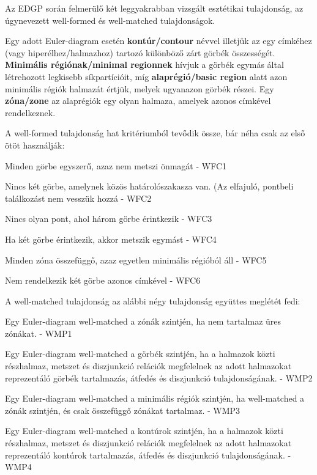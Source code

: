 Az EDGP során felmerülő két leggyakrabban vizsgált\cite{wellmatched_important, euler_force, which_well_formed, well_matchedness, orientation_comprehension} esztétikai tulajdonság, az úgynevezett well-formed és well-matched tulajdonságok.

\begin{definition}
Egy adott Euler-diagram esetén \textbf{kontúr/contour} névvel illetjük az egy címkéhez (vagy hiperélhez/halmazhoz) tartozó különböző zárt görbék összességét. \textbf{Minimális régiónak/minimal regionnek} hívjuk a görbék egymás által létrehozott legkisebb síkpartícióit, míg \textbf{alaprégió/basic region} alatt azon minimális régiók halmazát értjük, melyek ugyanazon görbék részei. Egy \textbf{zóna/zone} az alaprégiók egy olyan halmaza, amelyek azonos címkével rendelkeznek.
\end{definition}

A well-formed tulajdonság hat kritériumból tevődik össze, bár néha csak az első ötöt használják:

\begin{compactenum}
	\item Minden görbe egyszerű, azaz nem metszi önmagát - WFC1
	\item Nincs két görbe, amelynek közös határolószakasza van. (Az elfajuló, pontbeli találkozást nem vesszük hozzá - WFC2
	\item Nincs olyan pont, ahol három görbe érintkezik - WFC3
	\item Ha két görbe érintkezik, akkor metszik egymást - WFC4
	\item Minden zóna összefüggő, azaz egyetlen minimális régióból áll - WFC5
	\item Nem rendelkezik két görbe azonos címkével - WFC6\\
\end{compactenum}

A well-matched tulajdonság az alábbi négy tulajdonság együttes meglétét fedi:

\begin{compactenum}
	\item Egy Euler-diagram well-matched a zónák szintjén, ha nem tartalmaz üres zónákat. - WMP1
	\item Egy Euler-diagram well-matched a görbék szintjén, ha a halmazok közti részhalmaz, metszet és diszjunkció relációk megfelelnek az adott halmazokat reprezentáló görbék tartalmazás, átfedés és diszjunkció tulajdonságának. - WMP2
	\item Egy Euler-diagram well-matched a minimális régiók szintjén, ha well-matched a zónák szintjén, és csak összefüggő zónákat tartalmaz. - WMP3
	\item Egy Euler-diagram well-matched a kontúrok szintjén, ha a halmazok közti részhalmaz, metszet és diszjunkció relációk megfelelnek az adott halmazokat reprezentáló kontúrok tartalmazás, átfedés és diszjunkció tulajdonságának. - WMP4
\end{compactenum}

